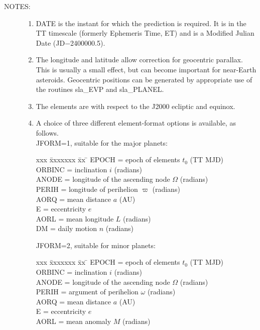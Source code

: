 \documentclass[11pt,twoside]{article}
\newlength{\oldspacing}
\newcommand{\notes}[1]
{
  \goodbreak
  \setlength{\oldspacing}{\topsep}
  \setlength{\topsep}{0.3ex}
  \begin{description}
    \item[NOTES]:
        #1
  \end{description}
  \setlength{\topsep}{\oldspacing}
}
\renewcommand{\notes}[1]
   {
      \begin{description}
         \item[NOTES:]
            #1
      \end{description}
   }
\begin{document}
\notes
{
 \begin{enumerate}
  \item DATE is the instant for which the prediction is
        required.  It is in the TT timescale (formerly
        Ephemeris Time, ET) and is a
        Modified Julian Date (JD$-$2400000.5).
  \item The longitude and latitude allow correction for geocentric
        parallax.  This is usually a small effect, but can become
        important for near-Earth asteroids.  Geocentric positions
        can be generated by appropriate use of the routines
        sla\_EVP and sla\_PLANEL.
  \item The elements are with respect to the J2000 ecliptic and equinox.
  \item A choice of three different element-format options is available, as
        follows. \\

        JFORM=1, suitable for the major planets:

        \begin{tabbing}
        xxx \= xxxxxxx \= xx \= \kill
        \> EPOCH  \> = \> epoch of elements $t_0$ (TT MJD) \\
        \> ORBINC \> = \> inclination $i$ (radians) \\
        \> ANODE  \> = \> longitude of the ascending node $\Omega$ (radians) \\
        \> PERIH  \> = \> longitude of perihelion $\varpi$ (radians) \\
        \> AORQ   \> = \> mean distance $a$ (AU) \\
        \> E      \> = \> eccentricity $e$ \\
        \> AORL   \> = \> mean longitude $L$ (radians) \\
        \> DM     \> = \> daily motion $n$ (radians)
        \end{tabbing}

        JFORM=2, suitable for minor planets:

        \begin{tabbing}
        xxx \= xxxxxxx \= xx \= \kill
        \> EPOCH  \> = \> epoch of elements $t_0$ (TT MJD) \\
        \> ORBINC \> = \> inclination $i$ (radians) \\
        \> ANODE  \> = \> longitude of the ascending node $\Omega$ (radians) \\
        \> PERIH  \> = \> argument of perihelion $\omega$ (radians) \\
        \> AORQ   \> = \> mean distance $a$ (AU) \\
        \> E      \> = \> eccentricity $e$ \\
        \> AORL   \> = \> mean anomaly $M$ (radians)
        \end{tabbing}


\end{enumerate}}
\end{document}
